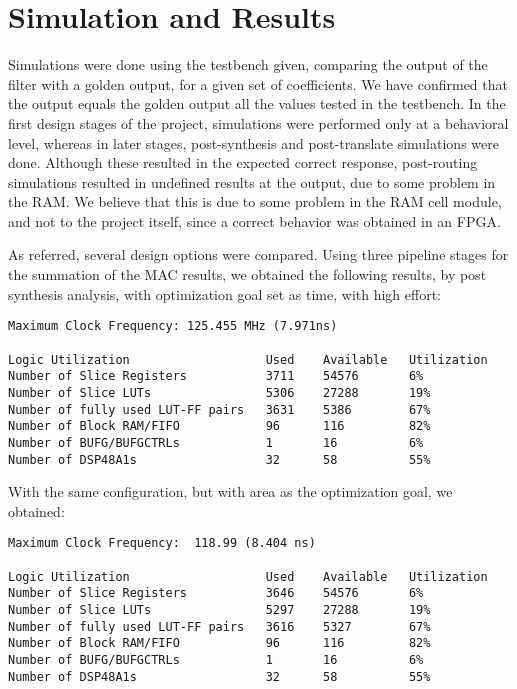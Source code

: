 \documentclass[12pt]{article}
\begin{document}
\section{Simulation and Results}
Simulations were done using the testbench given, comparing the output of the filter with a golden
output, for a given set of coefficients. We have confirmed that the output equals the golden output
all the values tested in the testbench. In the first design stages of the project, simulations were
performed only at a behavioral level, whereas in later stages, post-synthesis and post-translate
simulations were done. Although these resulted in the expected correct response, post-routing
simulations resulted in undefined results at the output, due to some problem in the RAM. We believe
that this is due to some problem in the RAM cell module, and not to the project itself, since a
correct behavior was obtained in an FPGA.

As referred, several design options were compared. Using three pipeline stages for the summation of
the MAC results, we obtained the following results, by post synthesis analysis, with optimization
goal set as time, with high effort:

\begin{verbatim}
Maximum Clock Frequency: 125.455 MHz (7.971ns)

Logic Utilization                   Used    Available   Utilization
Number of Slice Registers           3711    54576       6%
Number of Slice LUTs                5306    27288       19%
Number of fully used LUT-FF pairs   3631    5386        67%
Number of Block RAM/FIFO            96      116         82%
Number of BUFG/BUFGCTRLs            1       16          6%
Number of DSP48A1s                  32      58          55%
\end{verbatim}

With the same configuration, but with area as the optimization goal, we obtained:

\begin{verbatim}
Maximum Clock Frequency:  118.99 (8.404 ns)

Logic Utilization                   Used    Available   Utilization
Number of Slice Registers           3646    54576       6%
Number of Slice LUTs                5297    27288       19%
Number of fully used LUT-FF pairs   3616    5327        67%
Number of Block RAM/FIFO            96      116	        82%
Number of BUFG/BUFGCTRLs            1       16          6%
Number of DSP48A1s                  32      58          55%
\end{verbatim}
\end{document}
